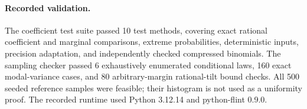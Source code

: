 \paragraph{Recorded validation.} The coefficient test suite passed 10 test methods, covering exact rational coefficient and marginal comparisons, extreme probabilities, deterministic inputs, precision adaptation, and independently checked compressed binomials. The sampling checker passed 6 exhaustively enumerated conditional laws, 160 exact modal-variance cases, and 80 arbitrary-margin rational-tilt bound checks. All 500 seeded reference samples were feasible; their histogram is not used as a uniformity proof. The recorded runtime used Python 3.12.14 and python-flint 0.9.0.
